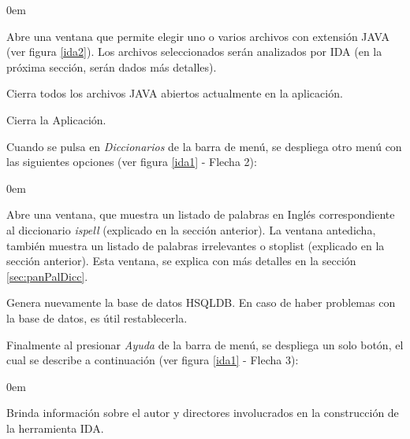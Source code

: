 \begin{description}
\itemsep0em%
\item[Abrir archivo(s) JAVA:] Abre una ventana que permite elegir uno o varios archivos con extensión JAVA (ver figura \ref{ida2}). Los archivos seleccionados serán analizados por IDA (en la próxima sección, serán dados más detalles).
\item[Cerrar Todo:] Cierra todos los archivos JAVA abiertos actualmente en la aplicación.
\item[Salir:] Cierra la Aplicación.
\end{description}

Cuando se pulsa en \textit{Diccionarios} de la barra de menú, se despliega otro menú con las siguientes opciones (ver figura \ref{ida1} - Flecha 2):

\begin{description}
\itemsep0em%

\item[Ver Diccionarios:] Abre una ventana, que muestra un listado de palabras en Inglés correspondiente al diccionario \textit{ispell} (explicado en la sección anterior). %
La ventana antedicha, también muestra un listado de palabras irrelevantes o stoplist (explicado en la sección anterior). Esta ventana, se explica con más detalles en la sección \ref{sec:panPalDicc}.

\item[Restablecer B.D.(Base de Datos):] Genera nuevamente la base de datos HSQLDB. En caso de haber problemas con la base de datos, es útil restablecerla.

\end{description}

Finalmente al presionar \textit{Ayuda} de la barra de menú, se despliega un solo botón, el cual se describe a continuación (ver figura \ref{ida1} - Flecha 3):

\begin{description}
\itemsep0em%
\item[Acerca de:] Brinda información sobre el autor y directores involucrados en la construcción de la herramienta IDA.
\end{description}

